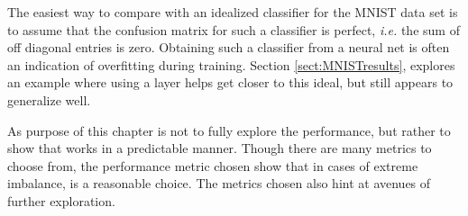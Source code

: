 
The easiest way to compare with an idealized classifier for the MNIST data set is to assume that the confusion matrix for such a classifier is perfect, \textit{i.e.} the sum of off diagonal entries is zero. Obtaining such a classifier from a neural net is often an indication of overfitting during training. Section \ref{sect:MNISTresults}, explores an example where using a \RS layer helps get closer to this ideal, but still appears to generalize well.

%
%
%


As purpose of this chapter is not to fully explore the performance, but rather to show that \RS works in a predictable manner. Though there are many metrics to choose from, the performance metric chosen show that in cases of extreme imbalance, \RS is a reasonable choice.  The metrics chosen also hint at avenues of further exploration.
